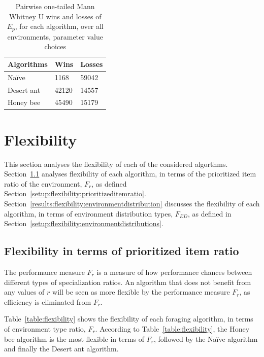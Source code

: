 \begin{table}[]
\centering
\caption{Pairwise one-tailed Mann Whitney U wins and losses of $E_p$, for each algorithm, over all environments, parameter value choices }
\label{summarytable}
\begin{tabular}{@{}lll@{}}
\toprule
\textbf{Algorithms} & \textbf{Wins} & \textbf{Losses} \\ \midrule
Na\"ive               & 1168          & 59042           \\
Desert ant          & 42120         & 14557           \\
Honey bee           & 45490         & 15179           \\ \bottomrule
\end{tabular}
\end{table}

\section{Flexibility}
\label{results:flexibility}

This section analyses the flexibility of each of the considered algorthms. Section~\ref{results:prioritizeditemratio} analyses flexibility of each algorithm, in terms of the prioritized item ratio of the environment, $F_r$, as defined Section~\ref{setup:flexibility:prioritizeditemratio}. Section~\ref{results:flexibility:environmentdistribution} discusses the flexibility of each algorithm, in terms of environment distribution types, $F_{ED}$, as defined in Section~\ref{setup:flexibility:environmentdistributions}.

\subsection{Flexibility in terms of prioritized item ratio}
\label{results:prioritizeditemratio}

The performance measure $F_r$ is a measure of how performance chances between different types of specialization ratios. An algorithm that does not benefit from any values of $r$ will be seen as more flexible by the performance measure $F_r$, as efficiency is eliminated from $F_r$.

Table~\ref{table:flexibility} shows the flexibility of each foraging algorithm, in terms of environment type ratio, $F_r$. According to Table~\ref{table:flexibility}, the Honey bee algorithm is the most flexible in terms of $F_r$, followed by the Na\"ive algorithm and finally the Desert ant algorithm. 

